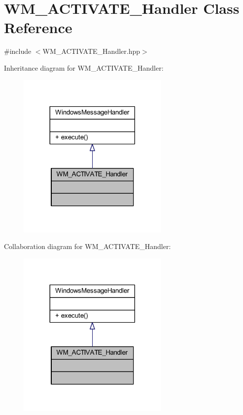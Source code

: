 \hypertarget{class_w_m___a_c_t_i_v_a_t_e___handler}{}\section{W\+M\+\_\+\+A\+C\+T\+I\+V\+A\+T\+E\+\_\+\+Handler Class Reference}
\label{class_w_m___a_c_t_i_v_a_t_e___handler}


{\ttfamily \#include $<$W\+M\+\_\+\+A\+C\+T\+I\+V\+A\+T\+E\+\_\+\+Handler.\+hpp$>$}



Inheritance diagram for W\+M\+\_\+\+A\+C\+T\+I\+V\+A\+T\+E\+\_\+\+Handler\+:\nopagebreak
\begin{figure}[H]
\begin{center}
\leavevmode
\includegraphics[width=209pt]{class_w_m___a_c_t_i_v_a_t_e___handler__inherit__graph}
\end{center}
\end{figure}


Collaboration diagram for W\+M\+\_\+\+A\+C\+T\+I\+V\+A\+T\+E\+\_\+\+Handler\+:\nopagebreak
\begin{figure}[H]
\begin{center}
\leavevmode
\includegraphics[width=209pt]{class_w_m___a_c_t_i_v_a_t_e___handler__coll__graph}
\end{center}
\end{figure}
